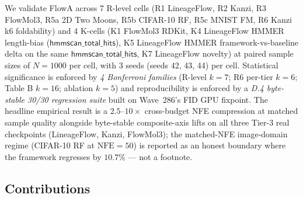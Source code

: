 \documentclass[journal,twocolumn,final]{IEEEtran}
\newcommand{\NFE}{\mathrm{NFE}}
\begin{document}
We validate FlowA across 7 R-level cells (R1 LineageFlow, R2 Kanzi, R3
FlowMol3, R5a 2D Two Moons, R5b CIFAR-10 RF, R5c MNIST FM, R6 Kanzi k6
foldability) and 4 K-cells (K1 FlowMol3 RDKit, K4 LineageFlow HMMER length-bias
($\mathsf{hmmscan\_total\_hits}$), K5 LineageFlow HMMER framework-vs-baseline
delta on the same $\mathsf{hmmscan\_total\_hits}$, K7 LineageFlow novelty) at
paired sample sizes of $N = 1000$ per cell, with 3 seeds (seeds 42, 43, 44) per
cell. Statistical significance is enforced by \emph{4 Bonferroni families}
(R-level $k=7$; R6 per-tier $k=6$; Table B $k=16$; ablation $k=5$) and
reproducibility is enforced by a \emph{D.4 byte-stable 30/30 regression
suite} built on Wave~286's FID GPU fixpoint. The headline empirical result is
a $2.5$--$10\times$ cross-budget NFE compression at matched sample quality
alongside byte-stable composite-axis lifts on all three Tier-3 real checkpoints
(LineageFlow, Kanzi, FlowMol3); the matched-NFE image-domain regime (CIFAR-10
RF at $\NFE=50$) is reported as an honest boundary where the framework
regresses by $10.7\%$ --- not a footnote.

\subsection*{Contributions}
\end{document}
